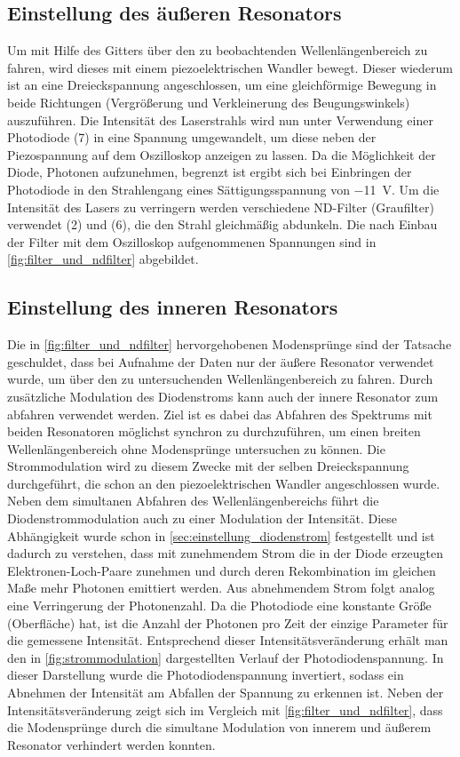 \subsection{Einstellung des äußeren Resonators}
Um mit Hilfe des Gitters über den zu beobachtenden Wellenlängenbereich zu fahren, wird dieses
mit einem piezoelektrischen Wandler bewegt. Dieser wiederum ist an eine Dreieckspannung angeschlossen,
um eine gleichförmige Bewegung in beide Richtungen (Vergrößerung und Verkleinerung des Beugungswinkels)
auszuführen. 
Die Intensität des Laserstrahls wird nun unter Verwendung einer Photodiode (7) in eine Spannung 
umgewandelt, um diese neben der Piezospannung auf dem Oszilloskop anzeigen zu lassen. 
Da die Möglichkeit der Diode, Photonen aufzunehmen, begrenzt ist ergibt sich bei Einbringen
der Photodiode in den Strahlengang eines Sättigungsspannung von \SI{-11}{\volt}.
Um die Intensität des Lasers zu verringern werden verschiedene ND-Filter (Graufilter) verwendet
(2) und (6), die den Strahl gleichmäßig abdunkeln. 
Die nach Einbau der Filter mit dem Oszilloskop aufgenommenen Spannungen sind in \cref{fig:filter_und_ndfilter}
abgebildet.

 

\subsection{Einstellung des inneren Resonators} \label{sec:innerer_resonator}
Die in \cref{fig:filter_und_ndfilter} hervorgehobenen Modensprünge sind der Tatsache geschuldet,
dass bei Aufnahme der Daten nur der äußere Resonator verwendet wurde, um über den zu untersuchenden
Wellenlängenbereich zu fahren. Durch zusätzliche Modulation des Diodenstroms kann auch der innere 
Resonator zum abfahren verwendet werden. Ziel ist es dabei das Abfahren des Spektrums mit beiden 
Resonatoren möglichst synchron zu durchzuführen, um einen breiten Wellenlängenbereich ohne 
Modensprünge untersuchen zu können. Die Strommodulation wird zu diesem Zwecke mit der 
selben Dreieckspannung durchgeführt, die schon an den piezoelektrischen Wandler angeschlossen wurde.
Neben dem simultanen Abfahren des Wellenlängenbereichs führt die Diodenstrommodulation auch zu 
einer Modulation der Intensität. Diese Abhängigkeit wurde schon in \cref{sec:einstellung_diodenstrom} 
festgestellt und ist dadurch zu verstehen, dass mit zunehmendem Strom die in der Diode erzeugten 
Elektronen-Loch-Paare zunehmen und durch deren Rekombination im gleichen Maße mehr Photonen
emittiert werden. Aus abnehmendem Strom folgt analog eine Verringerung der Photonenzahl. 
Da die Photodiode eine konstante Größe (Oberfläche) hat, ist die Anzahl der Photonen pro Zeit der
einzige Parameter für die gemessene Intensität.
Entsprechend dieser Intensitätsveränderung erhält man den in \cref{fig:strommodulation} dargestellten
Verlauf der Photodiodenspannung. In dieser Darstellung wurde die Photodiodenspannung invertiert,
sodass ein Abnehmen der Intensität am Abfallen der Spannung zu erkennen ist.
Neben der Intensitätsveränderung zeigt sich im Vergleich mit \cref{fig:filter_und_ndfilter},
dass die Modensprünge durch die simultane Modulation von innerem und äußerem Resonator verhindert
werden konnten.

